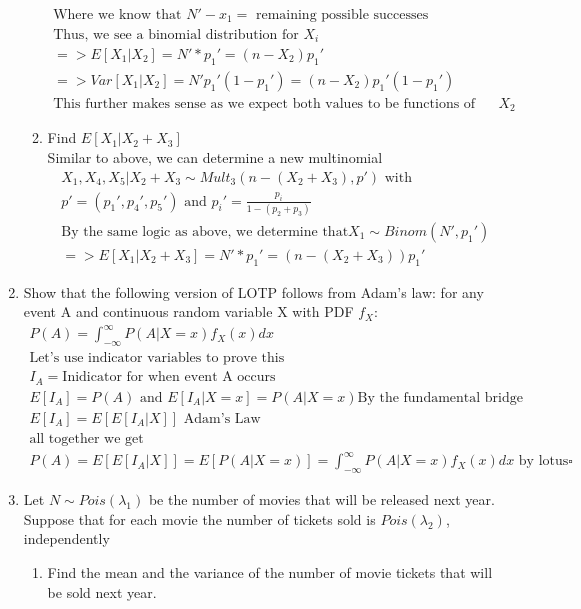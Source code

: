 \documentclass[11pt]{article}
\begin{document}
\begin{enumerate}
\begin{enumerate}
\begin{gather}
			\text{Where we know that } N'-x_1 = \text{ remaining possible successes} \\
			\text{Thus, we see a binomial distribution for }X_i\\
			=> E[X_1|X_2] = N'*p_1'= (n-X_2)p_1'\\
			=> Var[X_1|X_2] = N'p_1'(1-p_1') = (n-X_2)p_1'(1-p_1')\\
			\text{This further makes sense as we expect both values to be functions of our RV } X_2
			\end{gather}
			\item Find $E[X_1|X_2+X_3]$ 
			\\
			Similar to above, we can determine a new multinomial
			\begin{gather}
			X_1,X_4,X_5 | X_2+X_3 \sim Mult_3(n-(X_2+X_3),p') \text{ with }\\
			p'=(p_1',p_4',p_5')\text{ and } p_i'= \frac{p_i}{1-(p_2+p_3)}\\
			\text{By the same logic as above, we determine that} X_1 \sim Binom(N',p_1')\\
			=>E[X_1|X_2+X_3] = N'*p_1'= (n-(X_2+X_3))p_1'
			\end{gather}
		\end{enumerate}
		\item Show that the following version of LOTP follows from Adam’s law: for any event A and continuous random variable X with PDF $f_X$:
		\begin{gather}
		P(A) = \int_{-\infty}^{\infty}P(A|X=x)f_X(x)dx\\
		\text{Let's use indicator variables to prove this}\\
		I_A = \text{Inidicator for when event A occurs}\\
		E[I_A] = P(A) \text{ and } E[I_A|X=x]=P(A|X=x) \text{By the fundamental bridge} \\ 
		E[I_A] = E[E[I_A|X]] \text{ Adam's Law}\\
		\text{all together we get }\\
		P(A)= E[E[I_A|X]]=E[P(A|X=x)] = \int_{-\infty}^{\infty}P(A|X=x)f_X(x)dx \text{ by lotus}\square	
		\end{gather}
		\item Let $N \sim Pois(\lambda_1)$ be the number of movies that will be released next year. Suppose that for each movie the number of tickets sold is $Pois(\lambda_2)$, independently
		\begin{enumerate}
			\item Find the mean and the variance of the number of movie tickets that will be sold next year.

\end{enumerate}
\end{enumerate}
\end{document}
